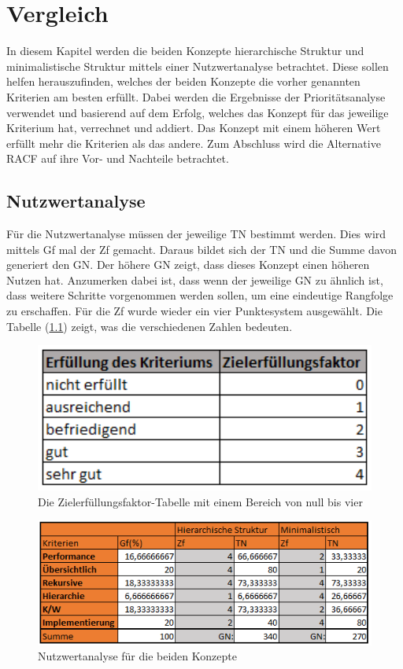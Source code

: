 \chapter{Vergleich}
\label{ch:chapter05}
In diesem Kapitel werden die beiden Konzepte hierarchische Struktur und minimalistische Struktur mittels einer Nutzwertanalyse betrachtet.
Diese sollen helfen herauszufinden, welches der beiden Konzepte die vorher genannten Kriterien am besten erfüllt.
Dabei werden die Ergebnisse der Prioritätsanalyse verwendet und basierend auf dem Erfolg, welches das Konzept für das jeweilige Kriterium hat, verrechnet und addiert.
Das Konzept mit einem höheren Wert erfüllt mehr die Kriterien als das andere.
Zum Abschluss wird die Alternative \ac{RACF} auf ihre Vor- und Nachteile betrachtet.

\section{Nutzwertanalyse}
\label{sec:chapter05:Nutz}
Für die Nutzwertanalyse müssen der jeweilige \ac{TN} bestimmt werden.
Dies wird mittels \ac{Gf} mal der \ac{Zf} gemacht.
Daraus bildet sich der \ac{TN} und die Summe davon generiert den \ac{GN}.
Der höhere \ac{GN} zeigt, dass dieses Konzept einen höheren Nutzen hat.
Anzumerken dabei ist, dass wenn der jeweilige \ac{GN} zu ähnlich ist, dass weitere Schritte vorgenommen werden sollen, um eine eindeutige Rangfolge zu erschaffen.
Für die \ac{Zf} wurde wieder ein vier Punktesystem ausgewählt.
Die Tabelle (\ref{fig:Ziel}) zeigt, was die verschiedenen Zahlen bedeuten. \cite{BdIufH}
\begin{figure}[h!]
 \centering
 \includegraphics[width=1\textwidth]{gfx/Picture/Ziel.PNG}
 \caption{Die Zielerfüllungsfaktor-Tabelle mit einem Bereich von null bis vier}
 \label{fig:Ziel}
\end{figure}
\newpage
\begin{figure}[h!]
 \centering
 \includegraphics[width=1\textwidth]{gfx/Picture/Nutzwert.PNG}
 \caption{Nutzwertanalyse für die beiden Konzepte}
 \label{fig:Nutz}
\end{figure}


